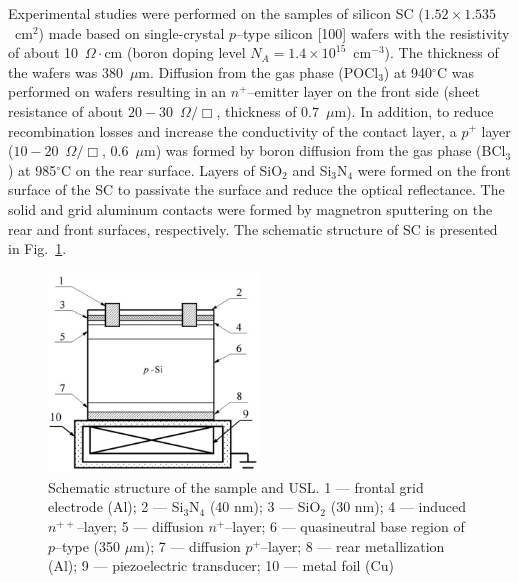 \documentclass[sn-mathphys]{sn-jnl}%
\theoremstyle{thmstyleone}%
\theoremstyle{thmstyletwo}%
\theoremstyle{thmstylethree}%
\begin{document}
Experimental studies were performed on the samples of silicon SC ($1.52\times1.535$~cm$^2$) made based on single-crystal  $p$--type silicon [100] wafers with the resistivity of about 10~$\Omega\cdot$cm
(boron doping level  $N_A=1.4\times10^{15}$~cm$^{-3}$).
The thickness of the wafers was 380~$\mu$m.
Diffusion from the gas phase (POCl$_3$) at 940$^\circ$C was performed on wafers resulting in an $n^+$--emitter layer on
the front side (sheet resistance of about $20-30$~$\Omega/\Box$, thickness of $0.7$~$\mu$m).
In addition, to reduce recombination losses and increase the conductivity of the contact layer,
a $p^+$ layer ($10-20$~$\Omega/\Box$, $0.6$~$\mu$m) was formed by boron diffusion from
the gas phase (BCl$_3$) at 985$^\circ$C on the rear surface.
Layers of SiO$_2$ and Si$_3$N$_4$ were formed on the front surface of the SC to passivate the surface and reduce the optical reflectance.
The solid and grid aluminum contacts were formed by magnetron sputtering on the rear and front surfaces, respectively.
The schematic structure of SC is presented in Fig.~\ref{figChem}.
\begin{figure}
\centering
\includegraphics[width=0.5\textwidth]{Fig1}
\caption{Schematic structure of the sample and USL.
1 --- frontal grid electrode (Al);
2 --- Si$_3$N$_4$ (40 nm);
3 --- SiO$_2$ (30 nm);
4 --- induced $n^{++}$--layer;
5 --- diffusion $n^+$--layer;
6 --- quasineutral base region of $p$--type (350 $\mu$m);
7 --- diffusion $p^+$--layer;
8 --- rear metallization (Al);
9 --- piezoelectric transducer;
10 --- metal foil (Cu)}
\label{figChem}       %
\end{figure}
\end{document}
